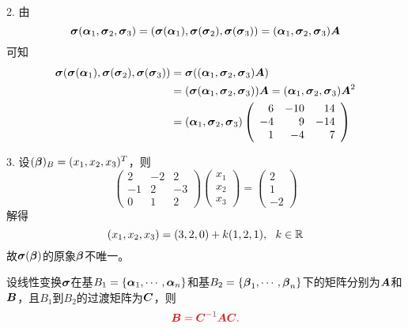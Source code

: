 \begin{frame}
  \begin{jie}
    2. 由
    $$
    \boldsymbol{\sigma}(\boldsymbol{\alpha}_1,\boldsymbol{\sigma}_2,\boldsymbol{\sigma}_3)=(\boldsymbol{\sigma}(\boldsymbol{\alpha}_1),\boldsymbol{\sigma}(\boldsymbol{\sigma}_2),\boldsymbol{\sigma}(\boldsymbol{\sigma}_3))=(\boldsymbol{\alpha}_1,\boldsymbol{\sigma}_2,\boldsymbol{\sigma}_3)\boldsymbol{A}
    $$
    可知
    $$
    \begin{aligned}
      \boldsymbol{\sigma}(\boldsymbol{\sigma}(\boldsymbol{\alpha}_1),\boldsymbol{\sigma}(\boldsymbol{\sigma}_2),\boldsymbol{\sigma}(\boldsymbol{\sigma}_3))
      &=\boldsymbol{\sigma}((\boldsymbol{\alpha}_1,\boldsymbol{\sigma}_2,\boldsymbol{\sigma}_3)\boldsymbol{A})\\
      &=(\boldsymbol{\sigma}(\boldsymbol{\alpha}_1,\boldsymbol{\sigma}_2,\boldsymbol{\sigma}_3))\boldsymbol{A}
      =(\boldsymbol{\alpha}_1,\boldsymbol{\sigma}_2,\boldsymbol{\sigma}_3)\boldsymbol{A}^2\\
      &=(\boldsymbol{\alpha}_1,\boldsymbol{\sigma}_2,\boldsymbol{\sigma}_3)\left(
      \begin{array}{rrr}
        6&-10&14\\
        -4&9&-14\\
        1&-4&7
      \end{array}
    \right)
    \end{aligned}
    $$
  \end{jie}
\end{frame}



\begin{frame}
\begin{jie}
  3. 设$(\boldsymbol{\beta})_B=(x_1,x_2,x_3)^T$，则
  $$
  \left(
    \begin{array}{rrr}
      2&-2&2\\
      -1&2&-3\\
      0&1&2
    \end{array}
  \right)\left(
    \begin{array}{c}
      x_1\\
      x_2\\
      x_3
    \end{array}
  \right)=\left(
    \begin{array}{r}
      2\\
      1\\
      -2
    \end{array}
  \right)
  $$
  解得
  $$
  (x_1,x_2,x_3)=(3,2,0)+k(1,2,1), ~~k\in \mathbb R
  $$
  故$\boldsymbol{\sigma}(\boldsymbol{\beta})$的原象$\boldsymbol{\beta}$不唯一。
\end{jie}
\end{frame}


\begin{frame}
  \begin{dingli}
    设线性变换$\boldsymbol{\sigma}$在基$B_1=\{\boldsymbol{\alpha}_1,\cdots,\boldsymbol{\alpha}_n\}$和基$B_2=\{\boldsymbol{\beta}_1,\cdots,\boldsymbol{\beta}_n\}$下的矩阵分别为$\boldsymbol{A}$和$\boldsymbol{B}$，且$B_1$到$B_2$的过渡矩阵为$\boldsymbol{C}$，则
    $$
    \textcolor{red}{\boldsymbol{B} = \boldsymbol{C}^{-1}\boldsymbol{A}\boldsymbol{C}.}
    $$
  \end{dingli}
\end{frame}


